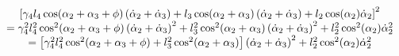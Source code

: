 \documentclass{article}
\begin{document}
\[
\begin{array}{c}
\left[ \gamma _{4}l_{4}\cos (\alpha _{2}+\alpha _{3}+\phi )\left( \dot{\alpha%
}_{2}+\dot{\alpha}_{3}\right) +l_{3}\cos (\alpha _{2}+\alpha _{3})\left( 
\dot{\alpha}_{2}+\dot{\alpha}_{3}\right) +l_{2}\cos (\alpha _{2})\dot{\alpha}%
_{2}\right] ^{2} \\ 
=\gamma _{4}^{2}l_{4}^{2}\cos ^{2}(\alpha _{2}+\alpha _{3}+\phi )\left( \dot{%
\alpha}_{2}+\dot{\alpha}_{3}\right) ^{2}+l_{3}^{2}\cos ^{2}(\alpha
_{2}+\alpha _{3})\left( \dot{\alpha}_{2}+\dot{\alpha}_{3}\right)
^{2}+l_{2}^{2}\cos ^{2}(\alpha _{2})\dot{\alpha}_{2}^{2} \\ 
=\left[ \gamma _{4}^{2}l_{4}^{2}\cos ^{2}(\alpha _{2}+\alpha _{3}+\phi
)+l_{3}^{2}\cos ^{2}(\alpha _{2}+\alpha _{3})\right] \left( \dot{\alpha}_{2}+%
\dot{\alpha}_{3}\right) ^{2}+l_{2}^{2}\cos ^{2}(\alpha _{2})\dot{\alpha}%
_{2}^{2}%
\end{array}%
\]%
\end{document}
